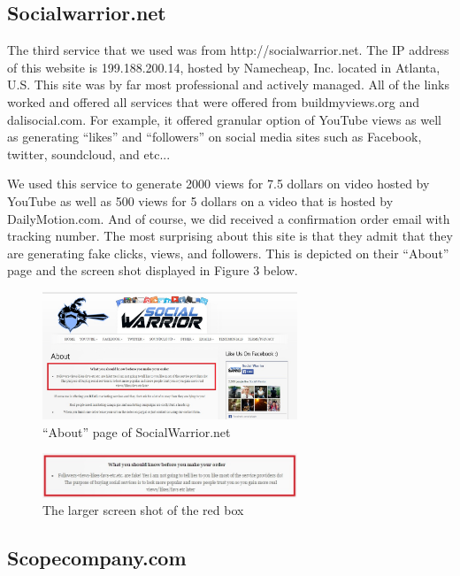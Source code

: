 \documentclass[conference]{IEEEtran}
\begin{document}
\subsection{Socialwarrior.net}

The third service that we used was from http://socialwarrior.net. The IP address of this website is 199.188.200.14, hosted by Namecheap, Inc. located in Atlanta, U.S. This site was by far most professional and actively managed. All of the links worked and offered all services that were offered from buildmyviews.org and dalisocial.com. For example, it offered granular option of YouTube views as well as generating “likes” and “followers” on social media sites such as Facebook, twitter, soundcloud, and etc...

We used this service to generate 2000 views for 7.5 dollars on video hosted by YouTube as well as 500 views for 5 dollars on a video that is hosted by DailyMotion.com. And of course, we did received a confirmation order email with tracking number. The most surprising about this site is that they admit that they are generating fake clicks, views, and followers. This is depicted on their ``About'' page and the screen shot displayed in Figure 3 below.

\begin{figure}[h]
  \centering
  \includegraphics[width=3.0in]{fig3a}
  \caption{``About'' page of SocialWarrior.net}
\end{figure}

\begin{figure}
  \centering
  \includegraphics[width=3.0in]{fig3b}
  \caption{The larger screen shot of the red box}
\end{figure}

\subsection{Scopecompany.com}
\end{document}
